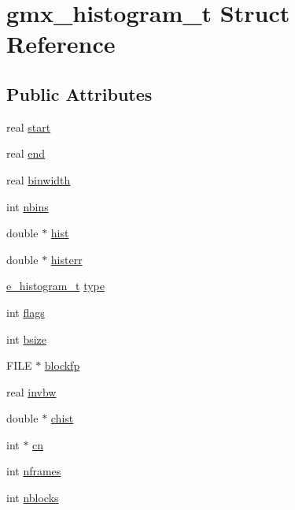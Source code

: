 \hypertarget{structgmx__histogram__t}{\section{gmx\-\_\-histogram\-\_\-t \-Struct \-Reference}
\label{structgmx__histogram__t}
}
\subsection*{\-Public \-Attributes}
\begin{DoxyCompactItemize}
\item 
real \hyperlink{structgmx__histogram__t_a20cc2acc8a203d8e26038d6e26172a3e}{start}
\item 
real \hyperlink{structgmx__histogram__t_aa2010aa4ba4421c82206f618eaa12e94}{end}
\item 
real \hyperlink{structgmx__histogram__t_ae21cb97b8c0cb98f65650fca713fb8b5}{binwidth}
\item 
int \hyperlink{structgmx__histogram__t_a0382d677083c77e24f471fb418f0f8a9}{nbins}
\item 
double $\ast$ \hyperlink{structgmx__histogram__t_ab24cdf5087598ca2c507dc629e181a4c}{hist}
\item 
double $\ast$ \hyperlink{structgmx__histogram__t_a97c7e2db1a468ee0aa730077ff417c75}{histerr}
\item 
\hyperlink{include_2histogram_8h_ae733abe5734389e4450335504bde8d0c}{e\-\_\-histogram\-\_\-t} \hyperlink{structgmx__histogram__t_af3de4312dbc5e1f517aa871d743a810f}{type}
\item 
int \hyperlink{structgmx__histogram__t_a276a8c03a110d680458e3ceb5afaeddd}{flags}
\item 
int \hyperlink{structgmx__histogram__t_afd5003c83824d3632eac7fc599b56983}{bsize}
\item 
\-F\-I\-L\-E $\ast$ \hyperlink{structgmx__histogram__t_a44ad1d0d9221e7a0019717f77d57e93b}{blockfp}
\item 
real \hyperlink{structgmx__histogram__t_a2f553cb83745162629d5425ab51288e2}{invbw}
\item 
double $\ast$ \hyperlink{structgmx__histogram__t_a7b8f859ea0b6a9708336f1c174c22eb0}{chist}
\item 
int $\ast$ \hyperlink{structgmx__histogram__t_aca07c93b198a997760d9dd6bee4bc521}{cn}
\item 
int \hyperlink{structgmx__histogram__t_aeca8377f09bce59c4140c39308b83c3f}{nframes}
\item 
int \hyperlink{structgmx__histogram__t_a861f7eec38c8b7e0198d6e69614c350a}{nblocks}
\end{DoxyCompactItemize}


